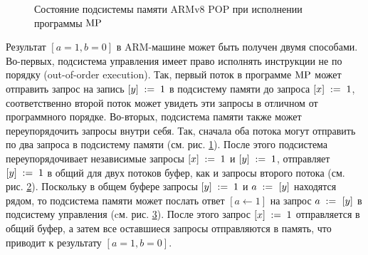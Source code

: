 \begin{figure}

\begin{subfigure}{.33\textwidth}
  \caption{}
  \label{fig:armvpop:mpstorage:1}
\end{subfigure}%
\begin{subfigure}{.33\textwidth}
  \caption{}
  \label{fig:armvpop:mpstorage:2}
\end{subfigure}%
\begin{subfigure}{.33\textwidth}
  \caption{}
  \label{fig:armvpop:mpstorage:3}
\end{subfigure}
\caption{Состояние подсистемы памяти ARMv8 POP при исполнении программы ${\rm MP}$}
\label{fig:armvpop:mpstorage}
\end{figure}

Результат $[a = 1, b = 0]$ в ARM-машине может быть получен двумя способами.
Во-первых, подсистема управления имеет право исполнять инструкции не по порядку (out-of-order execution).
Так, первый поток в программе ${\rm MP}$ может отправить запрос на запись $[y]\;:=\;1$ в подсистему памяти до запроса $[x]\;:=\;1$,
соответственно второй поток может увидеть эти запросы в отличном от программного порядке.
Во-вторых, подсистема памяти также может переупорядочить запросы внутри себя.
Так, сначала оба потока могут отправить по два запроса в подсистему памяти (см. рис. \ref{fig:armvpop:mpstorage:1}).
После этого подсистема переупорядочивает независимые запросы $[x]\;:=\;1$ и $[y]\;:=\;1$, отправляет $[y]\;:=\;1$
в общий для двух потоков буфер, как и запросы второго потока (см. рис. \ref{fig:armvpop:mpstorage:2}).
Поскольку в общем буфере запросы $[y]\;:=\;1$ и $a \;:=_{}\;[y]$ находятся рядом, то подсистема памяти может послать
ответ $[a \leftarrow 1]$ на запрос $a \;:=_{}\;[y]$ в подсистему управления (cм. рис. \ref{fig:armvpop:mpstorage:3}).
После этого запрос $[x]\;:=\;1$ отправляется в общий буфер, а затем все оставшиеся запросы отправляются в память,
что приводит к результату $[a = 1, b = 0]$.

